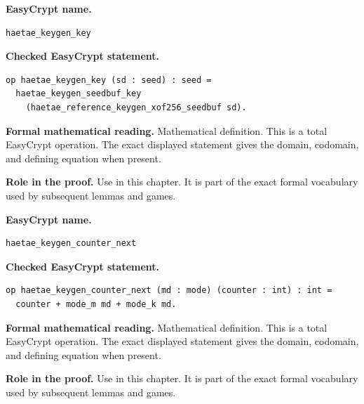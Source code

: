 \begin{formaldefinition}
\noindent\textbf{EasyCrypt name.}
\begin{lstlisting}[language=EasyCrypt,basicstyle=\ttfamily\scriptsize]
haetae_keygen_key
\end{lstlisting}
\noindent\textbf{Checked EasyCrypt statement.}
\begin{lstlisting}[language=EasyCrypt,basicstyle=\ttfamily\scriptsize]
op haetae_keygen_key (sd : seed) : seed =
  haetae_keygen_seedbuf_key
    (haetae_reference_keygen_xof256_seedbuf sd).
\end{lstlisting}
\noindent\textbf{Formal mathematical reading.}
Mathematical definition. This is a total EasyCrypt operation.  The exact displayed statement gives the domain, codomain, and defining equation when present.

\noindent\textbf{Role in the proof.}
Use in this chapter. It is part of the exact formal vocabulary used by subsequent lemmas and games.

\end{formaldefinition}

\begin{formaldefinition}
\noindent\textbf{EasyCrypt name.}
\begin{lstlisting}[language=EasyCrypt,basicstyle=\ttfamily\scriptsize]
haetae_keygen_counter_next
\end{lstlisting}
\noindent\textbf{Checked EasyCrypt statement.}
\begin{lstlisting}[language=EasyCrypt,basicstyle=\ttfamily\scriptsize]
op haetae_keygen_counter_next (md : mode) (counter : int) : int =
  counter + mode_m md + mode_k md.
\end{lstlisting}
\noindent\textbf{Formal mathematical reading.}
Mathematical definition. This is a total EasyCrypt operation.  The exact displayed statement gives the domain, codomain, and defining equation when present.

\noindent\textbf{Role in the proof.}
Use in this chapter. It is part of the exact formal vocabulary used by subsequent lemmas and games.

\end{formaldefinition}

